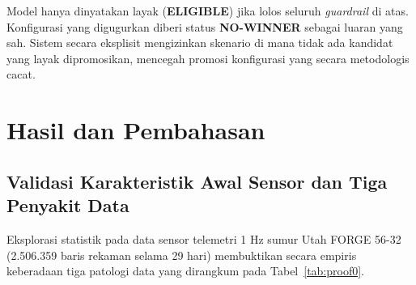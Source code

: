 \documentclass[conference]{IEEEtran}
\begin{document}
Model hanya dinyatakan layak (\textbf{ELIGIBLE}) jika lolos seluruh \textit{guardrail} di atas. Konfigurasi yang digugurkan diberi status \textbf{NO-WINNER} sebagai luaran yang sah. Sistem secara eksplisit mengizinkan skenario di mana tidak ada kandidat yang layak dipromosikan, mencegah promosi konfigurasi yang secara metodologis cacat.

\section{Hasil dan Pembahasan}

\subsection{Validasi Karakteristik Awal Sensor dan Tiga Penyakit Data}
Eksplorasi statistik pada data sensor telemetri 1 Hz sumur Utah FORGE 56-32 (2.506.359 baris rekaman selama 29 hari) membuktikan secara empiris keberadaan tiga patologi data yang dirangkum pada Tabel~\ref{tab:proof0}.

\begin{table}[!t]
\caption{Ringkasan Bukti Kuantitatif Tiga Patologi Data (Partisi Train 70\%)}
\label{tab:proof0}
\centering
\footnotesize
\renewcommand{\arraystretch}{1.15}
\end{table}
\end{document}
